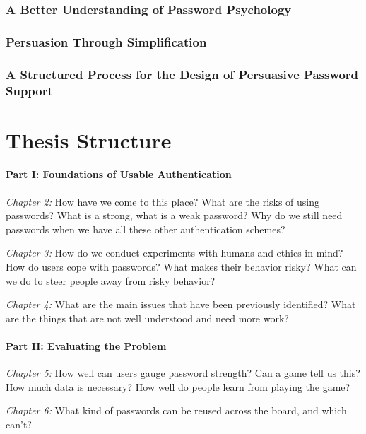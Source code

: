 \subsubsection{A Better Understanding of Password Psychology}

\subsubsection{Persuasion Through Simplification}

\subsubsection{A Structured Process for the Design of Persuasive Password Support}



\section{Thesis Structure}
\paragraph{Part I: Foundations of Usable Authentication}

\textit{Chapter 2:} %
How have we come to this place?
What are the risks of using passwords?
What is a strong, what is a weak password?
Why do we still need passwords when we have all these other authentication schemes?

\textit{Chapter 3:} %
How do we conduct experiments with humans and ethics in mind?
How do users cope with passwords? What makes their behavior risky?
What can we do to steer people away from risky behavior? 

\textit{Chapter 4:} 
What are the main issues that have been previously identified?
What are the things that are not well understood and need more work?


\paragraph{Part II: Evaluating the Problem}
\textit{Chapter 5:} %
How well can users gauge password strength?
Can a game tell us this?
How much data is necessary?
How well do people learn from playing the game?

\textit{Chapter 6:} %
What kind of passwords can be reused across the board, and which can't?

